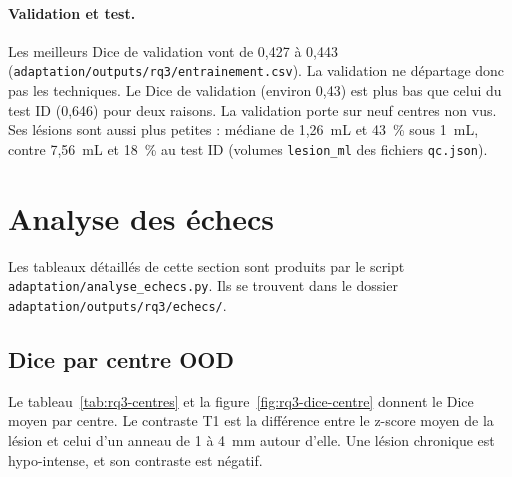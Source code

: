 \paragraph{Validation et test.}
Les meilleurs Dice de validation vont de 0,427 à 0,443 (\nolinkurl{adaptation/outputs/rq3/entrainement.csv}). La validation ne départage donc pas les techniques.
Le Dice de validation (environ 0,43) est plus bas que celui du test ID (0,646) pour deux raisons.
La validation porte sur neuf centres non vus.
Ses lésions sont aussi plus petites : médiane de 1,26~mL et 43~\% sous 1~mL, contre 7,56~mL et 18~\% au test ID (volumes \texttt{lesion\_ml} des fichiers \texttt{qc.json}).

\section{Analyse des échecs}
\label{sec:rq3-echecs}

Les tableaux détaillés de cette section sont produits par le script \nolinkurl{adaptation/analyse_echecs.py}.
Ils se trouvent dans le dossier \nolinkurl{adaptation/outputs/rq3/echecs/}.

\subsection{Dice par centre OOD}

Le tableau~\ref{tab:rq3-centres} et la figure~\ref{fig:rq3-dice-centre} donnent le Dice moyen par centre.
Le contraste T1 est la différence entre le z-score moyen de la lésion et celui d'un anneau de 1 à 4~mm autour d'elle. Une lésion chronique est hypo-intense, et son contraste est négatif.

